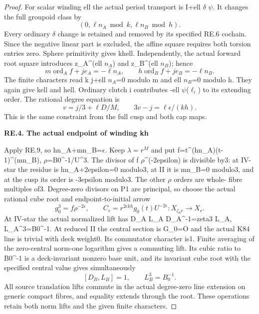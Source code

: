 \begin{proof}
For scalar winding ell the actual period transport is I+ell \(\delta\) \(\psi\).
It changes the full groupoid class by
\[
                     (0,\ell n_A\bmod k,\ell n_B\bmod h).
\tag{RE.17}
\]
Every ordinary \(\delta\) change is retained and removed by its specified
RE.6 cochain. Since the negative linear part is excluded, the affine
square requires both torsion entries zero. Sphere primitivity gives
kh\textbar ell. Independently, the actual forward root square introduces
z\_A\^{}(ell \(n_A\)) and z\_B\^{}(ell \(n_B\)); hence
\[
m\operatorname{ord}_A f+je_A=-\ell n_A,\qquad
h\operatorname{ord}_B f+je_B=-\ell n_B.\tag{RE.18}
\]
The finite characters read k j+ell \(n_A\)=0 modulo m and ell \(n_B\)=0 modulo h.
They again give k\textbar ell and h\textbar ell. Ordinary clutch i contributes
-ell \(\psi\)(\(\ell_i\)) to its extending order. The rational degree equation is
\[
                v=j/3+\ell D/M,\qquad 3v-j=\ell\epsilon/(kh).
\tag{RE.19}
\]
This is the same constraint from the full cusp and both cap maps.

\par

\medskip\noindent\textbf{RE.4. The actual endpoint of winding kh}

\par\nobreak

Apply RE.9, so hn\_A+mn\_B=\(\epsilon\). Keep \(\lambda=r^M\) and put
f=t\^{}(hn\_A)(t-1)\^{}(mn\_B), \(\rho\)=B0\^{}-1/U\^{}3. The divisor of
f \(\rho\)\^{}(-2epsilon) is divisible by3: at IV-star the residue is
hn\_A+2epsilon=0 modulo3, at II it is mn\_B=0 modulo3, and at the
cusp its order is -3epsilon modulo3. The other \(\rho\) orders are whole-
fibre multiples of3. Degree-zero divisors on P1 are principal, so choose
the actual rational cube root and endpoint-to-initial arrow
\[
g_0^3=f\rho^{-2\epsilon},\qquad
C_r=r^{2\epsilon kh}g_0(t)U^{-2\epsilon}:X_{\zeta_3r}\to X_r.
\tag{RE.20}
\]
At IV-star the actual normalized lift has D\_A L\_A D\_A\^{}-1=zeta3 L\_A,
L\_A\^{}3=B0\^{}-1. At reduced II the central section is G\textquotesingle\_0=O and the
actual K84 line is trivial with deck weight0. Its commutator character
is1. Finite averaging of the zero-central norm-one logarithm gives a
commuting lift. Its cubic ratio to B0\^{}-1 is a deck-invariant nonzero
base unit, and its invariant cube root with the specified central value
gives simultaneously
\[
                       [D_B,L_B]=1,\qquad L_B^3=B_0^{-1}.\tag{RE.21}
\]
All source translation lifts commute in the actual degree-zero line
extension on generic compact fibres, and equality extends through the
root. These operations retain both norm lifts and the given finite
characters.


\end{proof}
